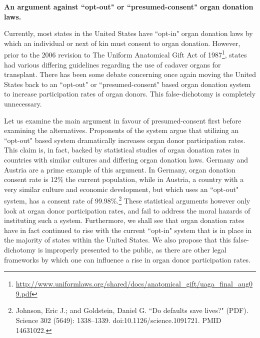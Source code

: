 \documentclass[letterpaper,10pt,twoside]{article}
\begin{document}
\begin{center}
\textbf{\large{An argument against ``opt-out" or ``presumed-consent" organ donation laws.}}
\end{center}
\vspace{0.5em}
Currently, most states in the United States have ``opt-in" organ donation laws by which an individual or next of kin must consent to organ donation.  However, prior to the 2006 revision to The Uniform Anatomical Gift Act of 1987\footnote{\url{http://www.uniformlaws.org/shared/docs/anatomical_gift/uaga_final_aug09.pdf}}, states had various differing guidelines regarding the use of cadaver organs for transplant.  There has been some debate concerning once again moving the United States back to an ``opt-out" or ``presumed-consent" based organ donation system to increase participation rates of organ donors.  This false-dichotomy is completely unnecessary.  

Let us examine the main argument in favour of presumed-consent first before examining the alternatives.  Proponents of the system argue that utilizing an ``opt-out" based system dramatically increases organ donor participation rates.  This claim is, in fact, backed by statistical studies of organ donation rates in countries with similar cultures and differing organ donation laws.  Germany and Austria are a prime example of this argument.  In Germany, organ donation consent rate is 12\% the current population, while in Austria, a country with a very similar culture and economic development, but which uses an ``opt-out" system, has a consent rate of 99.98\%.\footnote{ Johnson, Eric J.; and Goldstein, Daniel G. ``Do defaults save lives?" (PDF). Science 302 (5649): 1338–1339. doi:10.1126/science.1091721. PMID 14631022.}  These statistical arguments however only look at organ donor participation rates, and fail to address the moral hazards of instituting such a system.  Furthermore, we shall see that organ donation rates have in fact continued to rise with the current ``opt-in" system that is in place in the majority of states within the United States.  We also propose that this false-dichotomy is improperly presented to the public, as there are other legal frameworks by which one can influence a rise in organ donor participation rates.
\end{document}
